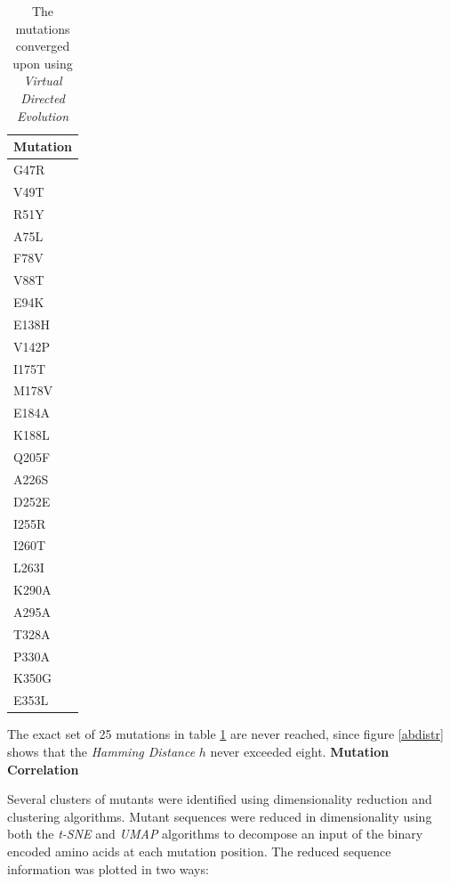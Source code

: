 \documentclass[16pt]{article}
\begin{document}
\begin{table}
        \begin{center}
		\caption{\label{mxntab} The mutations converged upon using \textit{Virtual Directed Evolution}}
		\begin{tabular}{l}
		\textbf{Mutation} \\
	    \hline
             G47R \\
             V49T \\
             R51Y \\
             A75L \\
             F78V \\
             V88T \\
             E94K \\
            E138H \\
            V142P \\
            I175T \\
            M178V \\
            E184A \\
            K188L \\
            Q205F \\
            A226S \\
            D252E \\
            I255R \\
            I260T \\
            L263I \\
            K290A \\
            A295A \\
            T328A \\
            P330A \\
            K350G \\
            E353L \\
\end{tabular}
        \end{center}
\end{table}

The exact set of 25 mutations in table \ref{mxntab} are never reached, since figure \ref{abdistr} shows that the \textit{Hamming Distance} $h$ never exceeded eight.
\textbf{Mutation Correlation}

Several clusters of mutants were identified using dimensionality reduction and clustering algorithms.
Mutant sequences were reduced in dimensionality using both the \textit{t-SNE} \cite{van2008visualizing} and \textit{UMAP} \cite{mcinnes2018umap} algorithms to decompose an input of the binary encoded  amino acids at each mutation position.
The reduced sequence information was plotted in two ways:
\end{document}
